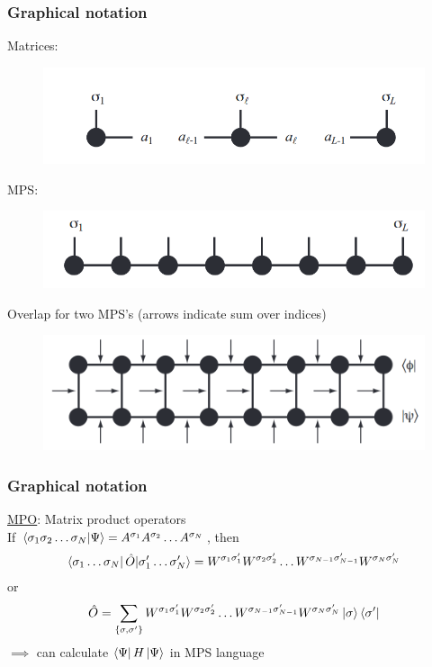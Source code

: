 \documentclass{beamer}
\theoremstyle{definition}
\begin{document}
\begin{frame}
	\frametitle{Graphical notation}
	Matrices:
	\vspace{-10pt}
	\begin{figure}[!htb]
		\centering
		\includegraphics[scale=0.3]{matrix.png}
	\end{figure}
\vspace{-10pt}
	MPS:
	\vspace{-10pt}
	\begin{figure}[!htb]
		\centering
		\includegraphics[scale=0.32]{mps.png}
	\end{figure}
	Overlap for two MPS's (arrows indicate sum over indices)
	\vspace{-6pt}
	\begin{figure}[!htb]
		\centering
		\includegraphics[scale=0.28]{overlap.png}
	\end{figure}
\end{frame}



\begin{frame}
	\frametitle{Graphical notation}
	\underline{MPO}: Matrix product operators \\
	
	\vspace{10pt}
	If $\bra{\sigma_1\sigma_2\dots \sigma_N} \ket{\Psi} = A^{\sigma_1}A^{\sigma_2}\dots A^{\sigma_N}$, then
	\begin{align*}
		\bra{\sigma_1\dots \sigma_N} \hat{O} |\sigma_1'\dots \sigma_N'\rangle = W^{\sigma_1\sigma'_1}W^{\sigma_2\sigma'_2}\dots W^{\sigma_{N-1}\sigma'_{N-1}}W^{\sigma_N\sigma'_N}
	\end{align*} 
	or \pause
	\begin{align*}
		\hat{O} = \sum_{\{\sigma,\sigma'\}} W^{\sigma_1\sigma'_1}W^{\sigma_2\sigma'_2}\dots W^{\sigma_{N-1}\sigma'_{N-1}}W^{\sigma_N\sigma'_N} \ket{\sigma}\langle \sigma'|
	\end{align*}
	$\implies$ can calculate $\bra{\Psi} H \ket{\Psi}$ in MPS language
\end{frame}
\end{document}
